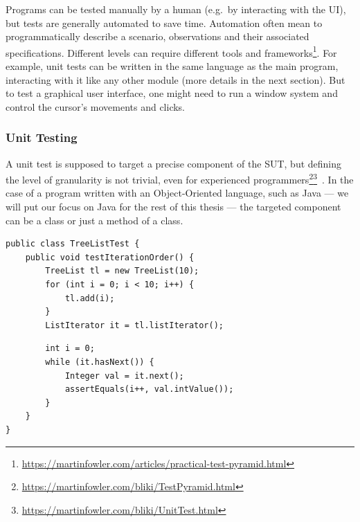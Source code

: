 \documentclass[a4paper,11pt]{sdm_internship}
\theoremstyle{definition}
\begin{document}
Programs can be tested manually by a human (e.g.\ by interacting with the UI), but tests are generally automated to save time.
Automation often mean to programmatically describe a scenario, observations and their associated specifications.
Different levels can require different tools and frameworks\footnote{\url{https://martinfowler.com/articles/practical-test-pyramid.html}}.
For example, unit tests can be written in the same language as the main program, interacting with it like any other module (more details in the next section).
But to test a graphical user interface, one might need to run a window system and control the cursor's movements and clicks.

\subsubsection{Unit Testing}%
\label{sssec:unit_testing}

A unit test is supposed to target a precise component of the SUT, but defining the level of granularity is not trivial, even for experienced programmers\footnote{\url{https://martinfowler.com/bliki/TestPyramid.html}}\footnote{\url{https://martinfowler.com/bliki/UnitTest.html}}~\cite{runeson2006survey}.
In the case of a program written with an Object-Oriented language, such as Java --- we will put our focus on Java for the rest of this thesis --- the targeted component can be a class or just a method of a class.

\begin{listing}[H]
  \centering
  \begin{verbatim}
public class TreeListTest {
    public void testIterationOrder() {
        TreeList tl = new TreeList(10);
        for (int i = 0; i < 10; i++) {
            tl.add(i);
        }
        ListIterator it = tl.listIterator();
  \end{verbatim}
  \begin{verbatim}
        int i = 0;
        while (it.hasNext()) {
            Integer val = it.next();
            assertEquals(i++, val.intValue());
        }
    }
}
  \end{verbatim}
  \caption{Example of an object-oriented unit test (taken, and adapted for readability, from the Apache Commons Collections, in the class TreeListTest, line 270\protect\footnotemark): it consists of test inputs (lines 3--7) that manipulate the SUT\@; and assertions (line 11). Methods \texttt{.hasNext()} and \texttt{.next()} (lines 9 \& 10) are expected, implicitly, to behave correctly.}%
\label{lst:test_example}
\end{listing}
\end{document}
